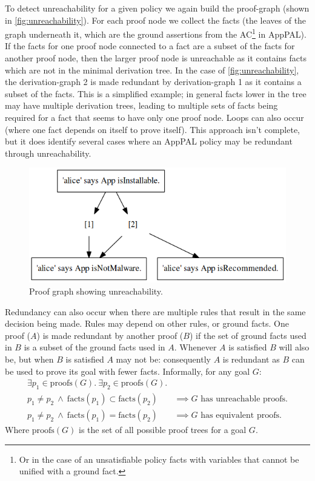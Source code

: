 \documentclass[thesis.tex]{subfiles}
\begin{document}
To detect unreachability for a given policy we again build the proof-graph (shown
in \autoref{fig:unreachability}).  For each proof node we collect the facts
(the leaves of the graph underneath it, which are the ground assertions from the
AC\footnote{Or in the case of an unsatisfiable policy facts with variables that
  cannot be unified with a ground fact.} in
AppPAL).  If the facts for one proof node connected to a fact are a subset of
the facts for another proof node, then the larger proof node is unreachable as it
contains facts which are not in the minimal derivation tree.   In the case of
\autoref{fig:unreachability}, the derivation-graph 2 is made redundant by
derivation-graph 1 as it contains a subset of the facts.  This is a
simplified example; in general facts lower in the tree may have multiple
derivation trees, leading to multiple sets of facts being required for a fact
that seems to have only one proof node.  Loops can also occur (where one fact
depends on itself to prove itself).  This approach isn't complete, but it does
identify several cases where an AppPAL policy may be redundant through
unreachability.


\begin{figure}
  \centering
  \includegraphics[width=0.5\linewidth]{./figures/unreachability.png}
  \caption{Proof graph showing unreachability.}
  \label{fig:unreachability}
\end{figure}

Redundancy can also occur when there are multiple rules that result in the
same decision being made.  Rules may depend on other rules, or ground
facts.  One proof ($A$) is made redundant by another proof ($B$) if
the set of ground facts used in $B$ is a subset of the ground facts
used in $A$. Whenever $A$ is satisfied $B$ will also be, but when $B$
is satisfied $A$ may not be: consequently $A$ is redundant as $B$ can
be used to prove its goal with fewer facts.  Informally, for any goal
$G$:
\begin{align*}
  \exists p_1 \in \text{proofs}(G).~\exists p_2 \in \text{proofs}(G).        & \\
  p_1 \not= p_2~\wedge~\text{facts}(p_1) \subset \text{facts}(p_2)           & \implies G\text{ has unreachable proofs.} \\
  p_1 \not= p_2~\wedge~\text{facts}(p_1) = \text{facts}(p_2)                 & \implies G\text{ has equivalent proofs.}
\end{align*}
Where $\text{proofs}(G)$ is the set of all possible proof trees for a goal $G$.
\end{document}
